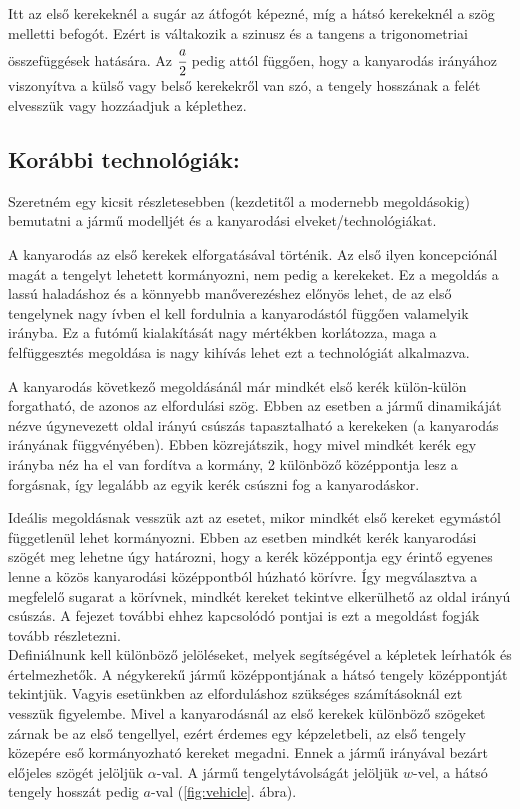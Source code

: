 Itt az első kerekeknél a sugár az átfogót képezné, míg a hátsó kerekeknél a szög melletti befogót. Ezért is váltakozik a szinusz és a tangens a trigonometriai összefüggések hatására. Az $\cfrac{a}{2}$ pedig attól függően, hogy a kanyarodás irányához viszonyítva a külső vagy belső kerekekről van szó, a tengely hosszának a felét elvesszük vagy hozzáadjuk a képlethez. 

\subsection{Korábbi technológiák:}

Szeretném egy kicsit részletesebben (kezdetitől a modernebb megoldásokig) bemutatni a jármű modelljét és a kanyarodási elveket/technológiákat. 

A kanyarodás az első kerekek elforgatásával történik. Az első ilyen koncepciónál magát a tengelyt lehetett kormányozni, nem pedig a kerekeket. Ez a megoldás a lassú haladáshoz és a könnyebb manőverezéshez előnyös lehet, de az első tengelynek nagy ívben el kell fordulnia a kanyarodástól függően valamelyik irányba. Ez a futómű kialakítását nagy mértékben korlátozza, maga a felfüggesztés megoldása is nagy kihívás lehet ezt a technológiát alkalmazva.

A kanyarodás következő megoldásánál már mindkét első kerék külön-külön forgatható, de azonos az elfordulási szög. Ebben az esetben a jármű dinamikáját nézve úgynevezett oldal irányú csúszás tapasztalható a kerekeken (a kanyarodás irányának függvényében). Ebben közrejátszik, hogy mivel mindkét kerék egy irányba néz ha el van fordítva a kormány, 2 különböző középpontja lesz a forgásnak, így legalább az egyik kerék csúszni fog a kanyarodáskor.

Ideális megoldásnak vesszük azt az esetet, mikor mindkét első kereket egymástól függetlenül lehet kormányozni. Ebben az esetben mindkét kerék kanyarodási szögét meg lehetne úgy határozni, hogy a kerék középpontja egy érintő egyenes lenne a közös kanyarodási középpontból húzható körívre. Így megválasztva a megfelelő sugarat a körívnek, mindkét kereket tekintve elkerülhető az oldal irányú csúszás. A fejezet további ehhez kapcsolódó pontjai is ezt a megoldást fogják tovább részletezni.\\

Definiálnunk kell különböző jelöléseket, melyek segítségével a képletek leírhatók és értelmezhetők. A négykerekű jármű középpontjának a hátsó tengely középpontját tekintjük. Vagyis esetünkben az elforduláshoz szükséges számításoknál ezt vesszük figyelembe. Mivel a kanyarodásnál az első kerekek különböző szögeket zárnak be az első tengellyel, ezért érdemes egy képzeletbeli, az első tengely közepére eső kormányozható kereket megadni. Ennek a jármű irányával bezárt előjeles szögét jelöljük $\alpha$-val. A jármű tengelytávolságát jelöljük $w$-vel, a hátsó tengely hosszát pedig $a$-val (\ref{fig:vehicle}. ábra).

